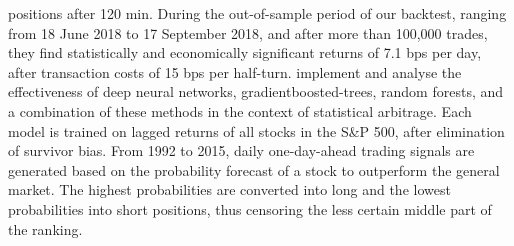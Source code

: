 positions after 120 min. During the out-of-sample period of our backtest, ranging from 18 June 2018
to 17 September 2018, and after more than 100,000 trades, they find statistically and economically
significant returns of 7.1 bps per day, after transaction costs of 15 bps per half-turn.
\cite{krauss2016arbitrageSandP} implement and analyse the effectiveness of deep neural networks, 
gradientboosted-trees, random forests, and a combination of these methods in
the context of statistical arbitrage. Each model is trained on lagged returns of all stocks in
the S\&P 500, after elimination of survivor bias. From 1992 to 2015, daily one-day-ahead
trading signals are generated based on the probability forecast of a stock to outperform
the general market. The highest probabilities are converted into long and the lowest
probabilities into short positions, thus censoring the less certain middle part of the ranking.